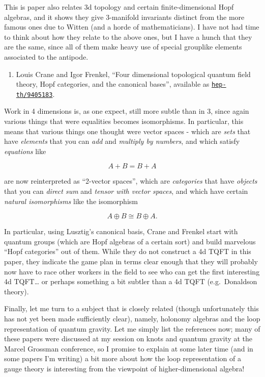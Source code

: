 \documentclass{article}
\def\tightlist{}
\begin{document}
This is paper also relates 3d topology and certain finite-dimensional
Hopf algebras, and it shows they give 3-manifold invariants distinct
from the more famous ones due to Witten (and a horde of mathematicians).
I have not had time to think about how they relate to the above ones,
but I have a hunch that they are the same, since all of them make heavy
use of special grouplike elements associated to the antipode.

\begin{enumerate}
\def\labelenumi{\arabic{enumi})}
\setcounter{enumi}{5}
\tightlist
\item
  Louis Crane and Igor Frenkel, ``Four dimensional topological quantum
  field theory, Hopf categories, and the canonical bases'', available as
  \href{http://xxx.lanl.gov/abs/hep-th/9405183}{\texttt{hep-th/9405183}}.
\end{enumerate}

Work in 4 dimensions is, as one expect, still more subtle than in 3,
since again various things that were equalities becomes isomorphisms. In
particular, this means that various things one thought were vector
spaces - which are \emph{sets} that have \emph{elements} that you can
\emph{add} and \emph{multiply by numbers}, and which satisfy
\emph{equations} like

\[A + B = B + A\]

are now reinterpreted as ``2-vector spaces'', which are
\emph{categories} that have \emph{objects} that you can \emph{direct
sum} and \emph{tensor with vector spaces}, and which have certain
\emph{natural isomorphisms} like the isomorphism

\[A \oplus B \cong B \oplus A.\]

In particular, using Lusztig's canonical basis, Crane and Frenkel start
with quantum groups (which are Hopf algebras of a certain sort) and
build marvelous ``Hopf categories'' out of them. While they do not
construct a 4d TQFT in this paper, they indicate the game plan in terms
clear enough that they will probably now have to race other workers in
the field to see who can get the first interesting 4d TQFT\ldots{} or
perhaps something a bit subtler than a 4d TQFT (e.g.~Donaldson theory).

Finally, let me turn to a subject that is closely related (though
unfortunately this has not yet been made sufficiently clear), namely,
holonomy algebras and the loop representation of quantum gravity. Let me
simply list the references now; many of these papers were discussed at
my session on knots and quantum gravity at the Marcel Grossman
conference, so I promise to explain at some later time (and in some
papers I'm writing) a bit more about how the loop representation of a
gauge theory is interesting from the viewpoint of higher-dimensional
algebra!
\end{document}
